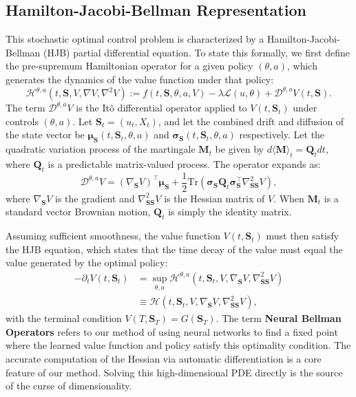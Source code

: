 \documentclass[ecta]{econsocart}
\theoremstyle{plain}
\theoremstyle{remark}
\newcommand{\hamiltonian}{\mathcal{H}}
\newcommand{\statevec}{\bm{S}}
\newcommand{\driftvec}{\bm{\mu}}
\newcommand{\diffvec}{\bm{\sigma}}
\begin{document}
\subsection{Hamilton-Jacobi-Bellman Representation}
This stochastic optimal control problem is characterized by a Hamilton-Jacobi-Bellman (HJB) partial differential equation. To state this formally, we first define the pre-supremum Hamiltonian operator for a given policy $(\theta, a)$, which generates the dynamics of the value function under that policy:
\begin{equation}
\mathcal{H}^{\theta,a}(t, \statevec, V, \nabla V, \nabla^2 V) := f(t,\statevec,\theta,a,V) - \lambda \mathcal{L}(u, \theta) + \mathcal{D}^{\theta,a}V(t,\statevec).
\end{equation}
The term $\mathcal{D}^{\theta,a}V$ is the Itô differential operator applied to $V(t, \statevec_t)$ under controls $(\theta,a)$. Let $\statevec_t = (u_t, X_t)$, and let the combined drift and diffusion of the state vector be $\driftvec_{\statevec}(t, \statevec_t, \theta, a)$ and $\diffvec_{\statevec}(t, \statevec_t, \theta, a)$ respectively. Let the quadratic variation process of the martingale $\bm{M}_t$ be given by $d\langle \bm{M} \rangle_t = \bm{Q}_t dt$, where $\bm{Q}_t$ is a predictable matrix-valued process. The operator expands as:
\begin{equation}
\mathcal{D}^{\theta,a}V = (\nabla_{\statevec} V)^\top \driftvec_{\statevec} + \frac{1}{2}\text{Tr}\left(\diffvec_{\statevec} \bm{Q}_t \diffvec_{\statevec}^\top \nabla_{\statevec\statevec}^2 V\right),
\end{equation}
where $\nabla_{\statevec} V$ is the gradient and $\nabla_{\statevec\statevec}^2 V$ is the Hessian matrix of $V$. When $\bm{M}_t$ is a standard vector Brownian motion, $\bm{Q}_t$ is simply the identity matrix.

Assuming sufficient smoothness, the value function $V(t,\statevec_t)$ must then satisfy the HJB equation, which states that the time decay of the value must equal the value generated by the optimal policy:
\begin{align}
\label{eq:hjb}
-\partial_t V(t,\statevec_t) &= \sup_{\theta, a} \mathcal{H}^{\theta,a}(t, \statevec_t, V, \nabla_{\statevec} V, \nabla_{\statevec\statevec}^2 V) \nonumber\\&\equiv \hamiltonian(t, \statevec_t, V, \nabla_{\statevec} V, \nabla_{\statevec\statevec}^2 V),
\end{align}
with the terminal condition $V(T, \statevec_T) = G(\statevec_T)$. The term \textbf{Neural Bellman Operators} refers to our method of using neural networks to find a fixed point where the learned value function and policy satisfy this optimality condition. The accurate computation of the Hessian via automatic differentiation is a core feature of our method. Solving this high-dimensional PDE directly is the source of the curse of dimensionality.
\end{document}
